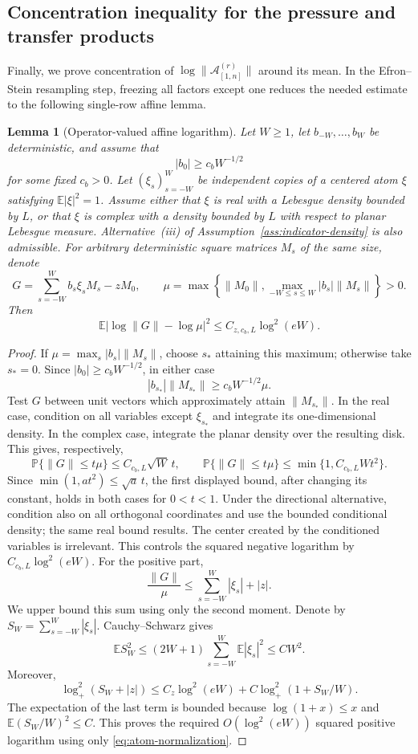 \documentclass[11pt,reqno]{amsart}
\numberwithin{equation}{section}
\newtheorem{lemma}[theorem]{Lemma}
\theoremstyle{definition}
\theoremstyle{remark}
\newcommand{\E}{\mathbb E}
\newcommand{\Pp}{\mathbb P}
\newcommand{\1}{\mathbf 1}
\begin{document}
\subsection{Concentration inequality for the pressure and transfer products}
\label{sec:concentration}
Finally, we prove concentration of
$\log\|\mathcal A_{[1,n]}^{(r)}\|$ around its mean.  In the
Efron--Stein resampling step, freezing all factors except one reduces the
needed estimate to the following single-row affine lemma.

\begin{lemma}[Operator-valued affine logarithm]\label{lem:operator-affine}
Let $W\ge1$, let $b_{-W},\ldots,b_W$ be deterministic, and assume that
\[
 |b_0|\ge c_bW^{-1/2}
\]
for some fixed $c_b>0$.  Let $(\xi_s)_{s=-W}^W$ be independent copies of
a centered atom $\xi$ satisfying $\E|\xi|^2=1$.  Assume either that $\xi$
is real with a Lebesgue density bounded by $L$, or that $\xi$ is complex
with a density bounded by $L$ with respect to planar Lebesgue measure.
Alternative~\textnormal{(iii)} of
Assumption~\ref{ass:indicator-density} is also admissible.  For arbitrary
deterministic square matrices $M_s$ of the same size, denote
\[
 G=\sum_{s=-W}^W b_s\xi_sM_s-zM_0,\qquad
 \mu=\max\left\{\|M_0\|,
       \max_{-W\le s\le W}|b_s|\|M_s\|\right\}>0.
\]
Then
\begin{equation}\label{eq:operator-affine}
 \E|\log\|G\|-\log\mu|^2\le C_{z,c_b,L}\log^2(eW).
\end{equation}
\end{lemma}

\begin{proof}
If \(\mu=\max_s|b_s|\|M_s\|\), choose \(s_*\) attaining this maximum;
otherwise take \(s_*=0\).  Since \(|b_0|\geq c_bW^{-1/2}\), in either case
\[
 |b_{s_*}|\|M_{s_*}\|\geq c_bW^{-1/2}\mu.
\]
Test $G$ between unit vectors which approximately attain
$\|M_{s_*}\|$.  In the real case, condition on all variables except
$\xi_{s_*}$ and integrate its one-dimensional density.  In the complex
case, integrate the planar density over the resulting disk.  This gives,
respectively,
\[
 \Pp\{\|G\|\le t\mu\}\le C_{c_b,L}\sqrt W\,t,
 \qquad
 \Pp\{\|G\|\le t\mu\}\le\min\{1,C_{c_b,L}Wt^2\}.
\]
Since $\min(1,at^2)\le\sqrt a\,t$, the first displayed bound, after
changing its constant, holds in both cases for $0<t<1$.  Under the
directional alternative, condition also on all orthogonal coordinates
and use the bounded conditional density; the same real bound results.
The center created by the conditioned variables is irrelevant.
This controls the squared negative logarithm by
\(C_{c_b,L}\log^2(eW)\).
For the positive part,
\[
 \frac{\|G\|}{\mu}
 \le\sum_{s=-W}^W|\xi_s|+|z|.
\]
We upper bound this sum using only the second moment. Denote by
$S_W=\sum_{s=-W}^W|\xi_s|$.  Cauchy--Schwarz gives
\[
 \E S_W^2\le(2W+1)\sum_{s=-W}^W\E|\xi_s|^2\le C W^2.
\]
Moreover,
\[
 \log_+^2(S_W+|z|)
 \le C_z\log^2(eW)+C\log_+^2(1+S_W/W).
\]
The expectation of the last term is bounded because
$\log(1+x)\le x$ and $\E(S_W/W)^2\le C$.  This proves the required
$O(\log^2(eW))$ squared positive logarithm using only
\eqref{eq:atom-normalization}.
\end{proof}
\end{document}
